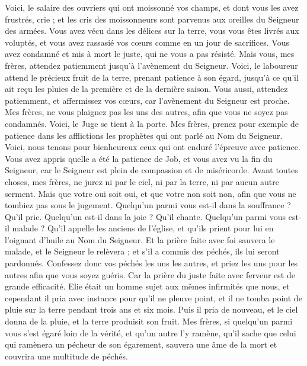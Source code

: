 \begin{multicols}{2}
Voici, le salaire des ouvriers qui ont moissonné vos champs, et dont vous les avez frustrés, crie ; et les cris des moissonneurs sont parvenus aux oreilles du Seigneur des armées.
Vous avez vécu dans les délices sur la terre, vous vous êtes livrés aux voluptés, et vous avez rassasié vos cœurs comme en un jour de sacrifices.
Vous avez condamné et mis à mort le juste, qui ne vous a pas résisté.
Mais vous, mes frères, attendez patiemment jusqu'à l'avènement du Seigneur. Voici, le laboureur attend le précieux fruit de la terre, prenant patience à son égard, jusqu'à ce qu'il ait reçu les pluies de la première et de la dernière saison.
Vous aussi, attendez patiemment, et affermissez vos cœurs, car l'avènement du Seigneur est proche.
Mes frères, ne vous plaignez pas les uns des autres, afin que vous ne soyez pas condamnés. Voici, le Juge se tient à la porte.
Mes frères, prenez pour exemple de patience dans les afflictions les prophètes qui ont parlé au Nom du Seigneur.
Voici, nous tenons pour bienheureux ceux qui ont enduré l'épreuve avec patience. Vous avez appris quelle a été la patience de Job, et vous avez vu la fin du Seigneur, car le Seigneur est plein de compassion et de miséricorde.
Avant toutes choses, mes frères, ne jurez ni par le ciel, ni par la terre, ni par aucun autre serment. Mais que votre oui soit oui, et que votre non soit non, afin que vous ne tombiez pas sous le jugement.
Quelqu'un parmi vous est-il dans la souffrance ? Qu'il prie. Quelqu'un est-il dans la joie ? Qu'il chante.
Quelqu'un parmi vous est-il malade ? Qu'il appelle les anciens de l'église, et qu'ils prient pour lui en l'oignant d'huile au Nom du Seigneur.
Et la prière faite avec foi sauvera le malade, et le Seigneur le relèvera ; et s'il a commis des péchés, ils lui seront pardonnés.
Confessez donc vos péchés les uns les autres, et priez les uns pour les autres afin que vous soyez guéris. Car la prière du juste faite avec ferveur est de grande efficacité.
Elie était un homme sujet aux mêmes infirmités que nous, et cependant il pria avec instance pour qu'il ne pleuve point, et il ne tomba point de pluie sur la terre pendant trois ans et six mois.
Puis il pria de nouveau, et le ciel donna de la pluie, et la terre produisit son fruit.
Mes frères, si quelqu'un parmi vous s'est égaré loin de la vérité, et qu'un autre l'y ramène,
qu'il sache que celui qui ramènera un pécheur de son égarement, sauvera une âme de la mort et couvrira une multitude de péchés.
\PPE{}
\end{multicols}
